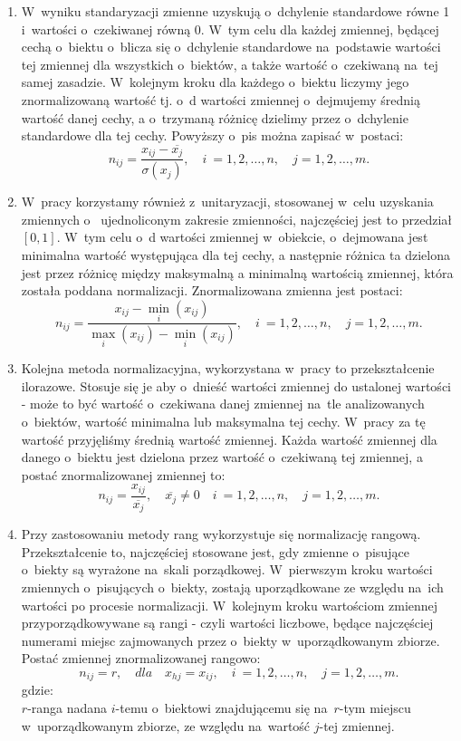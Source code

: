 \documentclass[12pt,a4paper]{report}
\begin{document}
\begin{enumerate}
\item W~wyniku standaryzacji zmienne uzyskują o~dchylenie standardowe równe 1 i~wartości o~czekiwanej  równą 0. W~tym celu dla każdej zmiennej, będącej cechą o~biektu o~blicza się o~dchylenie standardowe na~podstawie wartości tej zmiennej dla wszystkich o~biektów, a także wartość o~czekiwaną na~tej samej zasadzie. W~kolejnym kroku dla każdego o~biektu liczymy jego znormalizowaną wartość tj. o~d wartości zmiennej o~dejmujemy średnią wartość danej cechy, a o~trzymaną różnicę dzielimy przez o~dchylenie standardowe dla tej cechy. Powyższy o~pis można zapisać w~postaci: 
$$
n_{ij}=\frac{x_{ij} - \overline{x_{j}}}{\sigma(x_j)}, \quad i~= 1,2, \ldots, n, \quad j=1,2,\ldots, m.
$$



\item W~pracy korzystamy również z~unitaryzacji, stosowanej w~celu uzyskania zmiennych o~ ujednoliconym zakresie zmienności, najczęściej jest to przedział $[0,1]$. W~tym celu o~d wartości zmiennej w~obiekcie, o~dejmowana jest minimalna wartość występująca dla tej cechy, a następnie różnica ta dzielona jest przez różnicę między maksymalną a minimalną wartością zmiennej, która została poddana normalizacji. Znormalizowana zmienna jest postaci:
$$
n_{ij}=\frac{x_{ij} - \min\limits_{i}(x_{ij})}{\max\limits_{i} (x_{ij}) - \min\limits_{i} (x_{ij})}, \quad i~= 1,2, \ldots, n, \quad j=1,2,\ldots, m. 
$$
\item Kolejna metoda normalizacyjna, wykorzystana w~pracy to przekształcenie ilorazowe. Stosuje się  je aby o~dnieść wartości zmiennej do ustalonej wartości - może to być wartość o~czekiwana danej zmiennej na~tle analizowanych o~biektów, wartość minimalna lub maksymalna tej cechy. W~pracy za tę wartość przyjęliśmy średnią wartość zmiennej. Każda wartość zmiennej dla danego o~biektu jest dzielona przez wartość o~czekiwaną tej zmiennej, a postać znormalizowanej zmiennej to:
$$
n_{ij}=\frac{x_{ij}}{\overline{x_j}}, \quad \overline{x_j} \neq 0 \quad i~= 1,2, \ldots, n, \quad j=1,2,\ldots, m.
$$ 
\item Przy zastosowaniu metody rang wykorzystuje się normalizację rangową. Przekształcenie to, najczęściej stosowane jest, gdy zmienne o~pisujące o~biekty są wyrażone na~skali porządkowej. W~pierwszym kroku wartości zmiennych o~pisujących o~biekty, zostają uporządkowane ze względu na~ich wartości po procesie normalizacji. W~kolejnym kroku wartościom zmiennej przyporządkowywane są rangi - czyli wartości liczbowe, będące najczęściej numerami miejsc zajmowanych przez o~biekty w~uporządkowanym zbiorze. Postać zmiennej znormalizowanej rangowo:
$$
n_{ij}=r, \quad dla \quad x_{hj}=x_{ij}, \quad i~= 1,2, \ldots, n, \quad j=1,2,\ldots, m.
$$
gdzie:\\ 
$r$-ranga nadana $i$-temu o~biektowi znajdującemu się na~$r$-tym miejscu w~uporządkowanym zbiorze, ze względu na~wartość $j$-tej zmiennej. 
\end{enumerate}
\end{document}
